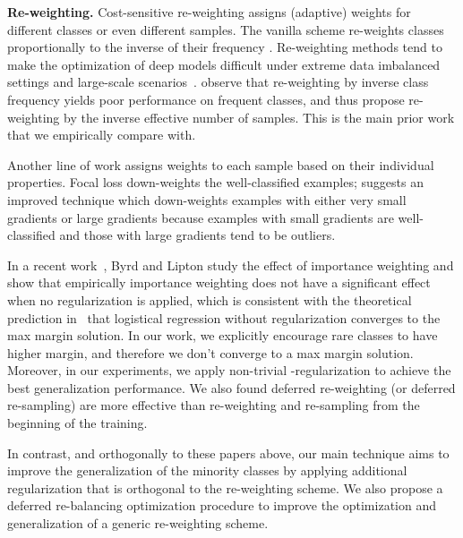 \documentclass{article}
\begin{document}
\textbf{Re-weighting.} Cost-sensitive re-weighting assigns (adaptive) weights for different classes or even different samples. The vanilla scheme re-weights classes proportionally to the inverse of their frequency \citep{huang2016learning,huang2019deep,wang2017learning}. 
Re-weighting methods tend to make the optimization of deep models difficult under extreme data imbalanced settings and large-scale scenarios~\citep{huang2016learning,huang2019deep}.
\citet{cui2019classbalancedloss} observe that re-weighting by inverse class frequency yields poor performance on frequent classes, and thus propose re-weighting by the inverse effective number of samples. 
This is the main prior work that we empirically compare with. 

Another line of work assigns weights to each sample based on their individual properties. Focal loss \citep{lin2017focal} down-weights the well-classified examples; \citet{li2018gradient} suggests an improved technique which down-weights examples with either very small gradients or large gradients because examples with small gradients are well-classified and those with large gradients tend to be outliers.

In a recent work~\citep{byrd2019what}, Byrd and Lipton study the effect of importance weighting and show that empirically importance weighting does not have a significant effect when no regularization is applied, which is consistent with the theoretical prediction in~\citep{soudry2018implicit} that logistical regression without regularization converges to the max margin solution. In our work, we explicitly encourage rare classes to have higher margin, and therefore we don't converge to a max margin solution. Moreover, in our experiments, we apply non-trivial -regularization to achieve the best generalization performance. We also found deferred re-weighting (or deferred re-sampling) are more effective than re-weighting and re-sampling from the beginning of the training. 

In contrast, and orthogonally to these papers above, our main technique aims to improve the generalization of the minority classes by applying additional regularization that is orthogonal to the re-weighting scheme. We also propose a deferred re-balancing optimization procedure to improve the optimization and generalization of a generic re-weighting scheme. 
\end{document}

